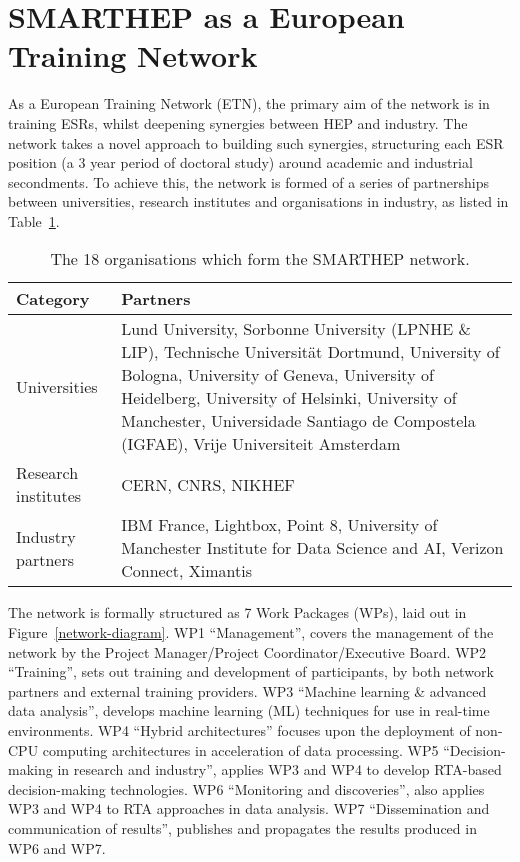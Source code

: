 \section{SMARTHEP as a European Training Network}
\label{network}
As a European Training Network (ETN), the primary aim of the network is in training ESRs, whilst deepening synergies between HEP and industry. The network takes a novel approach to building such synergies, structuring each ESR position (a 3 year period of doctoral study) around academic and industrial secondments. To achieve this, the network is formed of a series of partnerships between universities, research institutes and organisations in industry, as listed in Table~\ref{partners}.

\begin{table}[h!]
    \centering
    \small
    \begin{tabular}{p{2.5cm}p{9.5cm}}
    \hline
    Category & Partners \\\hline
    Universities & Lund University, Sorbonne University (LPNHE \& LIP), Technische Universit\"at Dortmund, University of Bologna, University of Geneva, University of Heidelberg, University of Helsinki, University of Manchester, Universidade Santiago de Compostela (IGFAE), Vrije Universiteit Amsterdam \\\hline
    Research institutes & CERN, CNRS, NIKHEF  \\\hline
    Industry partners & IBM France, Lightbox, Point 8, University of Manchester Institute for Data Science and AI, Verizon Connect, Ximantis\\\hline
    \end{tabular}
    \caption{The 18 organisations which form the SMARTHEP network.}
    \label{partners}       
\end{table}

The network is formally structured as 7 Work Packages (WPs), laid out in Figure~\ref{network-diagram}. WP1 ``Management'', covers the management of the network by the Project Manager/Project Coordinator/Executive Board. WP2 ``Training'', sets out training and development of participants, by both network partners and external training providers. WP3 ``Machine learning \& advanced data analysis'', develops machine learning (ML) techniques for use in real-time environments. WP4 ``Hybrid architectures'' focuses upon the deployment of non-CPU computing architectures in acceleration of data processing. WP5 ``Decision-making in research and industry'', applies WP3 and WP4 to develop RTA-based decision-making technologies. WP6 ``Monitoring and discoveries'', also applies WP3 and WP4 to RTA approaches in data analysis. WP7 ``Dissemination and communication of results'', publishes and propagates the results produced in WP6 and WP7.

